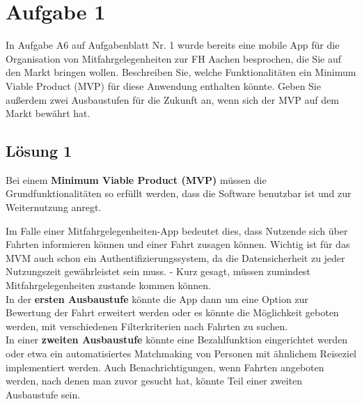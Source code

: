 \documentclass[main.tex]{subfiles}
\begin{document}
\section{Aufgabe 1}
In Aufgabe A6 auf Aufgabenblatt Nr. 1 wurde bereits eine mobile App für die Organisation von Mitfahrgelegenheiten zur FH Aachen besprochen, die Sie auf den Markt bringen wollen. Beschreiben Sie, welche Funktionalitäten ein Minimum Viable Product (MVP) für diese Anwendung enthalten könnte. Geben Sie außerdem zwei Ausbaustufen für die Zukunft an, wenn sich der MVP auf dem Markt bewährt hat.

\subsection{Lösung 1}
Bei einem \textbf{Minimum Viable Product (MVP)} müssen die Grundfunktionalitäten so erfüllt werden, dass die Software benutzbar ist und zur Weiternutzung anregt.

Im Falle einer Mitfahrgelegenheiten-App bedeutet dies, dass Nutzende sich über Fahrten informieren können und einer Fahrt zusagen können. Wichtig ist für das MVM auch schon ein Authentifizierungssystem, da die Datensicherheit zu jeder Nutzungszeit gewährleistet sein muss. - Kurz gesagt, müssen zumindest Mitfahrgelegenheiten zustande kommen können.\\

In der \textbf{ersten Ausbaustufe} könnte die App dann um eine Option zur Bewertung der Fahrt erweitert werden oder es könnte die Möglichkeit geboten werden, mit verschiedenen Filterkriterien nach Fahrten zu suchen.\\

In einer \textbf{zweiten Ausbaustufe} könnte eine Bezahlfunktion eingerichtet werden oder etwa ein automatisiertes Matchmaking von Personen mit ähnlichem Reiseziel implementiert werden. Auch Benachrichtigungen, wenn Fahrten angeboten werden, nach denen man zuvor gesucht hat, könnte Teil einer zweiten Ausbaustufe sein.
\end{document}
